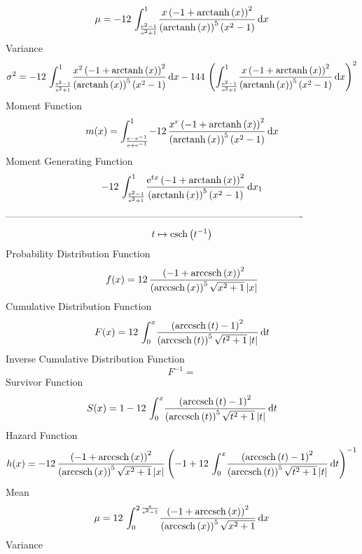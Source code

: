 \documentclass[12pt]{article}
\begin{document}
 $$ \mu=-12\,\int_{{\frac {{{\rm e}^{2}}-1}{{{\rm e}^{2}}+1}}}^{1}\!{\frac {x
 \left( -1+{\rm arctanh} \left(x\right) \right) ^{2}}{ \left( 
{\rm arctanh} \left(x\right) \right) ^{5} \left( {x}^{2}-1 \right) }}
\,{\rm d}x
$$ Variance 
 $$ \sigma^2 = -12\,\int_{{\frac {{{\rm e}^{2}}-1}{{{\rm e}^{2}}+1}}}^{1}\!{\frac {{x
}^{2} \left( -1+{\rm arctanh} \left(x\right) \right) ^{2}}{ \left( 
{\rm arctanh} \left(x\right) \right) ^{5} \left( {x}^{2}-1 \right) }}
\,{\rm d}x-144\, \left( \int_{{\frac {{{\rm e}^{2}}-1}{{{\rm e}^{2}}+1
}}}^{1}\!{\frac {x \left( -1+{\rm arctanh} \left(x\right) \right) ^{2}
}{ \left( {\rm arctanh} \left(x\right) \right) ^{5} \left( {x}^{2}-1
 \right) }}\,{\rm d}x \right) ^{2}
$$Moment Function 
 $$ m(x) = \int_{{\frac {{\rm e}-{{\rm e}^{-1}}}{{\rm e}+{{\rm e}^{-1}}}}}^{1}\!-
12\,{\frac {{x}^{r} \left( -1+{\rm arctanh} \left(x\right) \right) ^{2
}}{ \left( {\rm arctanh} \left(x\right) \right) ^{5} \left( {x}^{2}-1
 \right) }}\,{\rm d}x
$$ Moment Generating Function 
 $$-12\,\int_{{\frac {{{\rm e}^{2}}-1}{{{\rm e}^{2}}+1}}}^{1}\!{\frac {{
{\rm e}^{tx}} \left( -1+{\rm arctanh} \left(x\right) \right) ^{2}}{
 \left( {\rm arctanh} \left(x\right) \right) ^{5} \left( {x}^{2}-1
 \right) }}\,{\rm d}x_{{1}}
$$-------------------------------------------------------------------------------------------  \\$$t\mapsto {\rm csch} \left({t}^{-1}\right)
$$Probability Distribution Function 
$$  f(x)=12\,{\frac { \left( -1+{\rm arccsch} \left(x\right) \right) ^{2}}{
 \left( {\rm arccsch} \left(x\right) \right) ^{5}\sqrt {{x}^{2}+1}
 \left| x \right| }}
$$Cumulative Distribution Function  
 $$F(x)=12\,\int_{0}^{x}\!{\frac { \left( {\rm arccsch} \left(t\right)-1
 \right) ^{2}}{ \left( {\rm arccsch} \left(t\right) \right) ^{5}\sqrt 
{{t}^{2}+1} \left| t \right| }}\,{\rm d}t
$$ Inverse Cumulative Distribution Function 
  $$F^{-1} = $$Survivor Function 
 $$ S(x)=1-12\,\int_{0}^{x}\!{\frac { \left( {\rm arccsch} \left(t\right)-1
 \right) ^{2}}{ \left( {\rm arccsch} \left(t\right) \right) ^{5}\sqrt 
{{t}^{2}+1} \left| t \right| }}\,{\rm d}t
$$ Hazard Function 
 $$ h(x)=-12\,{\frac { \left( -1+{\rm arccsch} \left(x\right) \right) ^{2}}{
 \left( {\rm arccsch} \left(x\right) \right) ^{5}\sqrt {{x}^{2}+1}
 \left| x \right| } \left( -1+12\,\int_{0}^{x}\!{\frac { \left( 
{\rm arccsch} \left(t\right)-1 \right) ^{2}}{ \left( {\rm arccsch} 
\left(t\right) \right) ^{5}\sqrt {{t}^{2}+1} \left| t \right| }}
\,{\rm d}t \right) ^{-1}}
$$Mean 
 $$ \mu=12\,\int_{0}^{2\,{\frac {{\rm e}}{{{\rm e}^{2}}-1}}}\!{\frac { \left( 
-1+{\rm arccsch} \left(x\right) \right) ^{2}}{ \left( {\rm arccsch} 
\left(x\right) \right) ^{5}\sqrt {{x}^{2}+1}}}\,{\rm d}x
$$ Variance 
\end{document}
